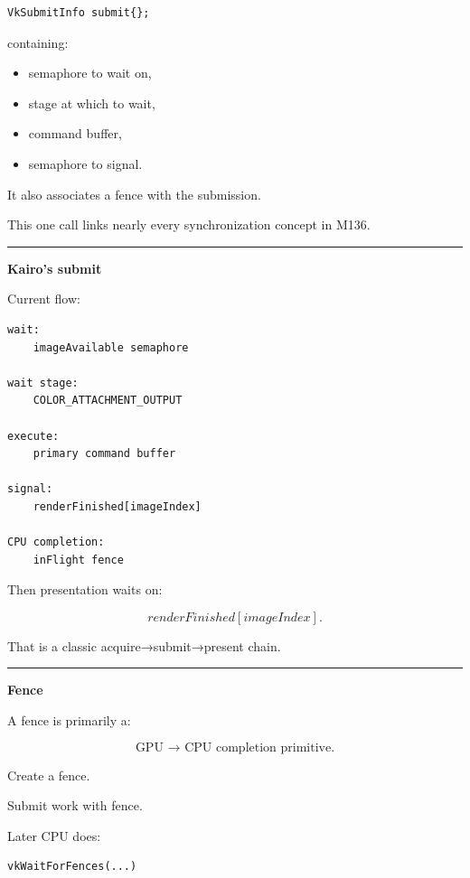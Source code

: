 \begin{verbatim}
VkSubmitInfo submit{};
\end{verbatim}

containing:

\begin{itemize}
\tightlist
\item
  semaphore to wait on,
\item
  stage at which to wait,
\item
  command buffer,
\item
  semaphore to signal.
\end{itemize}

It also associates a fence with the submission.

This one call links nearly every synchronization concept in M136.

\begin{center}\rule{0.5\linewidth}{0.5pt}\end{center}

\textbf{Kairo's submit}

Current flow:

\begin{verbatim}
wait:
    imageAvailable semaphore

wait stage:
    COLOR_ATTACHMENT_OUTPUT

execute:
    primary command buffer

signal:
    renderFinished[imageIndex]

CPU completion:
    inFlight fence
\end{verbatim}

Then presentation waits on:

\[
renderFinished[imageIndex].
\]

That is a classic acquire→submit→present chain.

\begin{center}\rule{0.5\linewidth}{0.5pt}\end{center}

\textbf{Fence}

A fence is primarily a:

\[
\boxed{\text{GPU → CPU completion primitive}.}
\]

Create a fence.

Submit work with fence.

Later CPU does:

\begin{verbatim}
vkWaitForFences(...)
\end{verbatim}

